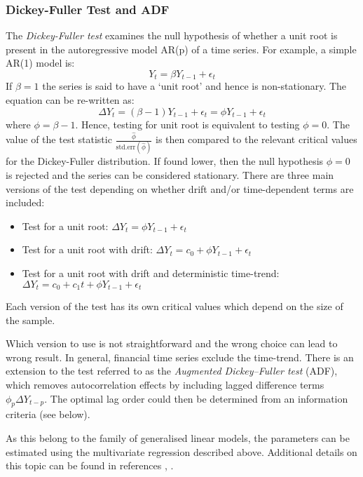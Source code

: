 \documentclass[11pt]{article}
\providecommand{\tightlist}{%
      \setlength{\itemsep}{0pt}\setlength{\parskip}{0pt}}
\begin{document}
\begin{appendices}
    \subsubsection{Dickey-Fuller Test and ADF}\label{dickey-fuller-test-and-adf}
    
The \emph{Dickey-Fuller test} examines the null hypothesis of whether a
unit root is present in the autoregressive model AR(p) of a time series. For example, a simple AR(1) model is:
\begin{equation}
Y_t = \beta Y_{t-1} + \epsilon_t
\end{equation}
If \(\beta=1\) the series is said to have a `unit root' and hence is
non-stationary. The equation can be re-written as:
\begin{equation}
\Delta Y_t = (\beta - 1) Y_{t-1} + \epsilon_t = \phi Y_{t-1} + \epsilon_t
\end{equation}
where \(\phi= \beta-1\). Hence, testing for unit root is equivalent to
testing \(\phi=0\).
The value of the test statistic $\frac{\hat{\phi}}{\text{std.err}(\hat{\phi})}$ is
then compared to the relevant critical values for the Dickey-Fuller
distribution. If found lower, then the null hypothesis \(\phi=0\) is
rejected and the series can be considered stationary.
There are three main versions of the test depending on whether drift and/or
time-dependent terms are included:
\begin{itemize}
\tightlist
\item
  Test for a unit root: \(\Delta Y_t = \phi Y_{t-1} + \epsilon_t\)
\item
  Test for a unit root with drift:
  \(\Delta Y_t = c_0 + \phi Y_{t-1} + \epsilon_t\)
\item
  Test for a unit root with drift and deterministic time-trend:
  \(\Delta Y_t = c_0 + c_1 t + \phi Y_{t-1} + \epsilon_t\)
\end{itemize}
Each version of the test has its own critical values which depend on
the size of the sample. 

Which version to use is not straightforward and
the wrong choice can lead to wrong result. In general, financial
time series exclude the time-trend.
There is an extension to the test referred to as the {\em Augmented
Dickey--Fuller test} (ADF), which removes autocorrelation effects by
including lagged difference terms \(\phi_p \Delta Y_{t-p}\). The optimal
lag order could then be determined from an  information criteria (see
below).

As this belong to the family of generalised linear
models,  the parameters can be estimated using the 
multivariate regression described above.
Additional details on this topic can be found in references \cite{wikiADF}, \cite{wikiDF}.


\end{appendices}
\end{document}
